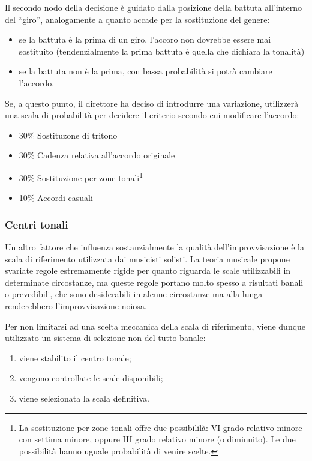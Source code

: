 Il secondo nodo della decisione è guidato dalla posizione della battuta all'interno del ``giro'', analogamente a quanto accade per la sostituzione del genere:
\begin{itemize}
\item se la battuta è la prima di un giro, l'accoro non dovrebbe essere mai sostituito (tendenzialmente la prima battuta è quella che dichiara la tonalità)
\item se la battuta non è la prima, con bassa probabilità si potrà cambiare l'accordo.
\end{itemize}

Se, a questo punto, il direttore ha deciso di introdurre una variazione, utilizzerà una scala di probabilità per decidere il criterio secondo cui modificare l'accordo:

\begin{itemize}
\item 30\% Sostituzone di tritono
\item 30\% Cadenza relativa all'accordo originale
\item 30\% Sostituzione per zone tonali\footnote{La sostituzione per zone tonali offre due possibililà: VI grado relativo minore con settima minore, oppure III grado relativo minore (o diminuito). Le due possibilità hanno uguale probabilità di venire scelte.}
\item 10\% Accordi casuali
\end{itemize}

\subsubsection{Centri tonali}\label{dir-tonalZones}
Un altro fattore che influenza sostanzialmente la qualità dell'improvvisazione è la scala di riferimento utilizzata dai musicisti solisti. 
La teoria musicale propone svariate regole estremamente rigide per quanto riguarda le scale utilizzabili in determinate circostanze, ma queste regole portano molto spesso a risultati banali o prevedibili, che sono desiderabili in alcune circostanze ma alla lunga renderebbero l'improvvisazione noiosa.

Per non limitarsi ad una scelta meccanica della scala di riferimento, viene dunque utilizzato un sistema di selezione non del tutto banale:

\begin{enumerate}
\item viene stabilito il centro tonale;
\item vengono controllate le scale disponibili;
\item viene selezionata la scala definitiva.
\end{enumerate}


